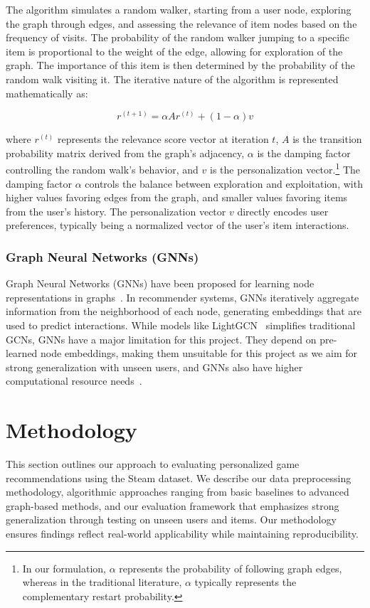 \documentclass[conference,compsoc]{IEEEtran}
\begin{document}
The algorithm simulates a random walker, starting from a user node, exploring the graph through edges, and assessing the relevance of item nodes based on the frequency of visits. The probability of the random walker jumping to a specific item is proportional to the weight of the edge, allowing for exploration of the graph. The importance of this item is then determined by the probability of the random walk visiting it. The iterative nature of the algorithm is represented mathematically as:

\begin{equation}
    r^{(t+1)} = \alpha A r^{(t)} + (1-\alpha)v
\end{equation}

\noindent where $r^{(t)}$ represents the relevance score vector at iteration $t$, $A$ is the transition probability matrix derived from the graph's adjacency, $\alpha$ is the damping factor controlling the random walk's behavior, and $v$ is the personalization vector.\footnote{In our formulation, $\alpha$ represents the probability of following graph edges, whereas in the traditional literature, $\alpha$ typically represents the complementary restart probability.} The damping factor $\alpha$ controls the balance between exploration and exploitation, with higher values favoring edges from the graph, and smaller values favoring items from the user's history. The personalization vector $v$ directly encodes user preferences, typically being a normalized vector of the user's item interactions.

\subsubsection{Graph Neural Networks (GNNs)}
Graph Neural Networks (GNNs) have been proposed for learning node representations in graphs~\cite{1812.08434}. In recommender systems, GNNs iteratively aggregate information from the neighborhood of each node, generating embeddings that are used to predict interactions. While models like LightGCN~\cite{2002.02126} simplifies traditional GCNs, GNNs have a major limitation for this project. They depend on pre-learned node embeddings, making them unsuitable for this project as we aim for strong generalization with unseen users, and GNNs also have higher computational resource needs~\cite{1707.07435}.

\section{Methodology}
This section outlines our approach to evaluating personalized game recommendations using the Steam dataset. We describe our data preprocessing methodology, algorithmic approaches ranging from basic baselines to advanced graph-based methods, and our evaluation framework that emphasizes strong generalization through testing on unseen users and items. Our methodology ensures findings reflect real-world applicability while maintaining reproducibility.
\end{document}
